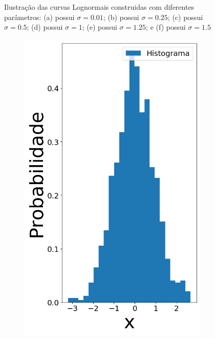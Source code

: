 \begin{figure}[H]
\begin{subfigure}[b]{0.3\textwidth}
		\caption{}
		\label{fig:sig150}
	\end{subfigure}
	
	\caption{Ilustração das curvas Lognormais construidas com diferentes parâmetros: (a) possui $\sigma = 0.01$; (b) possui $\sigma = 0.25$; (c) possui $\sigma = 0.5$; (d) possui $\sigma = 1$; (e) possui $\sigma = 1.25$; e (f) possui $\sigma = 1.5$}
	\label{fig:Lognormal}
\end{figure}



\begin{figure}[H]
	\centering
	\begin{subfigure}[b]{0.27\textwidth}
		\centering 
		\includegraphics[width=\linewidth]{./figuras/datanormal_0}

\end{subfigure}
\end{figure}
